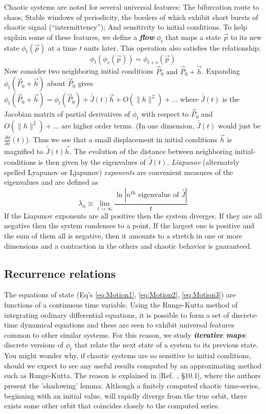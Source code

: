\documentclass{../lab}
\begin{document}
Chaotic systems are noted for several universal features: The bifurcation route to chaos; Stable windows of periodicity, the borders of which exhibit short bursts of chaotic signal (``intermittency''); And sensitivity to initial conditions. To help explain some of these features, we define a \emph{\textbf{flow}} $ \phi_t $ that maps a state $ \vec p $ to its new state $ {\phi}_t(\vec p) $ at a time \emph{t} units later. This operation also satisfies the relationship:
\[
    \phi_t(\phi_s(\vec p)) = \phi_{t+s}(\vec p)
\]
Now consider two neighboring initial conditions $\vec P_0 \text{ and } \vec P_0+\vec h$. Expanding $\phi_t(\vec P_0+\vec h)$ about $\vec P_0$ gives $\phi_t(\vec P_0+\vec h) = \phi_t(\vec P_0) + \bar{\bar J}(t)\vec h + O(\| h\|^2) + \ldots$ where $\bar{\bar J}(t)$ is the Jacobian matrix of partial derivatives of $\phi_t$ with respect to $\vec P_0$ and $O(\| h\|^2) + \ldots$ are higher order terms. (In one dimension, $\bar{\bar J}(t)$ would just be $ \frac{\partial\phi}{\partial x}(t) $). Thus we see that a small displacement in initial conditions $ \vec h $ is magnified to $ \bar{\bar J}(t)\vec h $. The evolution of the distance between neighboring initial-conditions is then given by the eigenvalues of $ \bar{\bar J}(t) $. \emph{Liapunov} (alternately spelled Lyapunov or Ljapunov) \emph{exponents} are convenient measures of the eigenvalues and are defined as
\begin{equation}
    \lambda_n \equiv \lim_{t \to \infty}\frac{\ln| n^\text{th} \text{ eigenvalue of } \bar{\bar J}| }{t}
\end{equation}
If the Liapunov exponents are all positive then the system diverges. If they are all negative then the system condenses to a point. If the largest one is positive and the sum of them all is negative, then it amounts to a stretch in one or more dimensions and a contraction in the others and chaotic behavior is guaranteed.

\subsection{Recurrence relations}

The equations of state (Eq's \eqref{eq:Motion1}, \eqref{eq:Motion2}, 
\eqref{eq:Motion3}) are functions of a continuous time variable. Using the Runge-Kutta method of integrating ordinary differential equations, it is possible to form a set of discrete-time dynamical equations and these are seen to exhibit universal features common to other similar systems. For this reason, we study \emph{\textbf{iterative maps}}: discrete versions of $ \phi_t $ that relate the next state of a system to its previous state. You might wonder why, if chaotic systems are so sensitive to initial conditions, should we expect to see any useful results computed by an approximating method such as Runge-Kutta. The reason is explained in [Ref.~\cite{Strogatz}, \S10.1], where the authors present the 'shadowing' lemma: Although a finitely computed chaotic time-series, beginning with an initial value, will rapidly diverge from the true orbit, there exists some other orbit that coincides closely to the computed series.
\end{document}
